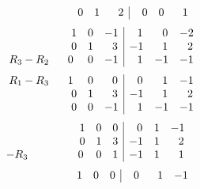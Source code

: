 \documentclass[12pt]{amsart}
\begin{document}
\begin{enumerate}
\begin{align}
\begin{array}{ccc|ccc}
				\hspace{2.4cm} 0& 1&\text{ } \text{ }2 &\text{ } \text{ }0 &0 &\text{ } \text{ }1
			\end{array} \notag
		\end{align} 
		\begin{align}
			\begin{array}{ccc|ccc}
				\hspace{2.4cm} 1 &0 &-1 &\text{ } \text{ }1 &\text{ } \text{ }0 &-2 \\
				\hspace{2.4cm} 0 &1 &\text{ } \text{ }3 &-1 &\text{ } \text{ }1 &\text{ } \text{ }2  \\
				\hspace{0.3cm} R_3-R_2 \hspace{0.6cm} 0& 0&-1 &\text{ } \text{ }1 &-1 &-1
			\end{array} \notag
		\end{align} 
		\begin{align}
			\begin{array}{ccc|ccc}
				\hspace{0.3cm} R_1-R_3 \hspace{0.6cm} 1 &0 &\text{ } \text{ }0 &\text{ } \text{ }0 &\text{ } 					\text{ }1 &-1 \\
				\hspace{2.4cm} 0 &1 &\text{ } \text{ }3 &-1 &\text{ } \text{ }1 &\text{ } \text{ }2  \\
				\hspace{2.4cm} 0& 0&-1 &\text{ } \text{ }1 &-1 &-1
			\end{array} \notag
		\end{align} 
		\begin{align}
			\begin{array}{ccc|ccc}
				\hspace{2.4cm} 1 &0 &0 &\text{ } \text{ }0 &1 &-1 \\
				\hspace{2.4cm} 0 &1 &3 &-1 &1 &\text{ } \text{ }2  \\
				-R_3 \hspace{1.6cm} 0& 0&1 &-1 &1 &\text{ } \text{ }1
			\end{array} \notag
		\end{align} 
		\begin{align}
			\begin{array}{ccc|ccc}
				\hspace{2.4cm} 1 &0 &0 &\text{ } \text{ }0 &\text{ } \text{ }1 &-1 \\

\end{array}
\end{align}
\end{enumerate}
\end{document}
